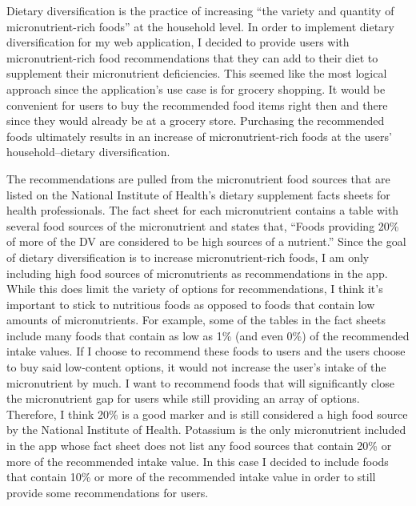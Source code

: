 \documentclass[10pt,twocolumn]{article}
\begin{document}
Dietary diversification is the practice of increasing “the variety and quantity of micronutrient-rich foods” at the household level.\cite{jsi_2016} In order to implement dietary diversification for my web application, I decided to provide users with micronutrient-rich food recommendations that they can add to their diet to supplement their micronutrient deficiencies. This seemed like the most logical approach since the application’s use case is for grocery shopping. It would be convenient for users to buy the recommended food items right then and there since they would already be at a grocery store. Purchasing the recommended foods ultimately results in an increase of micronutrient-rich foods at the users’ household–dietary diversification. 

The recommendations are pulled from the micronutrient food sources that are listed on the National Institute of Health’s dietary supplement facts sheets for health professionals.\cite{NIH} The fact sheet for each micronutrient contains a table with several food sources of the micronutrient and states that, “Foods providing 20\% of more of the DV are considered to be high sources of a nutrient.”\cite{NIH} Since the goal of dietary diversification is to increase micronutrient-rich foods, I am only including high food sources of micronutrients as recommendations in the app. While this does limit the variety of options for recommendations, I think it’s important to stick to nutritious foods as opposed to foods that contain low amounts of micronutrients. For example, some of the tables in the fact sheets include many foods that contain as low as 1\% (and even 0\%) of the recommended intake values. If I choose to recommend these foods to users and the users choose to buy said low-content options, it would not increase the user’s intake of the micronutrient by much. I want to recommend foods that will significantly close the micronutrient gap for users while still providing an array of options. Therefore, I think 20\% is a good marker and is still considered a high food source by the National Institute of Health. Potassium is the only micronutrient included in the app whose fact sheet does not list any food sources that contain 20\% or more of the recommended intake value.\cite{potassium} In this case I decided to include foods that contain 10\% or more of the recommended intake value in order to still provide some recommendations for users. 
\end{document}
